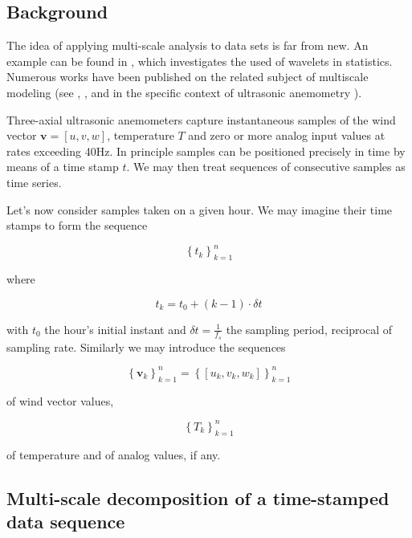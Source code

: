 \documentclass[a4paper,10pt]{book}
\begin{document}
\subsection{Background}

The idea of applying multi-scale analysis to data sets is far from new. An example can be found in \cite{Percival2000}, which investigates the used of wavelets in statistics. Numerous works have been published on the related subject of multiscale modeling (see \cite{Barth2002}, \cite{Ferreira2007}, and in the specific context of ultrasonic anemometry \cite{Howell1997}).

Three-axial ultrasonic anemometers capture instantaneous samples of the wind vector $\mathbf{v} = [u,v,w]$, temperature $T$ and zero or more analog input values at rates exceeding 40Hz. In principle samples can be positioned precisely in time by means of a time stamp $t$. We may then treat sequences of consecutive samples as time series.

Let's now consider samples taken on a given hour. We may imagine their time stamps to form the sequence

\begin{equation}\label{eq:Time Stamps}
\left\{t_{k}\right\}_{k=1}^{n}
\end{equation}

\noindent where

\begin{equation}
t_{k} = t_{0} + (k-1) \cdot \delta t
\end{equation}

\noindent with $t_{0}$ the hour's initial instant and $\delta t = \frac{1}{f_{s}}$ the sampling period, reciprocal of sampling rate. Similarly we may introduce the sequences

\begin{equation}\label{eq:Wind Vector}
\left\{\mathbf{v}_{k}\right\}_{k=1}^{n} = \left\{[u_{k}, v_{k}, w_{k}]\right\}_{k=1}^{n}
\end{equation}

\noindent of wind vector values,

\begin{equation}\label{eq:Temperature}
\left\{T_{k}\right\}_{k=1}^{n}
\end{equation}

\noindent of temperature and of analog values, if any.

\subsection{Multi-scale decomposition of a time-stamped data sequence}
\label{sec:Multi-scale decomposition}
\end{document}
